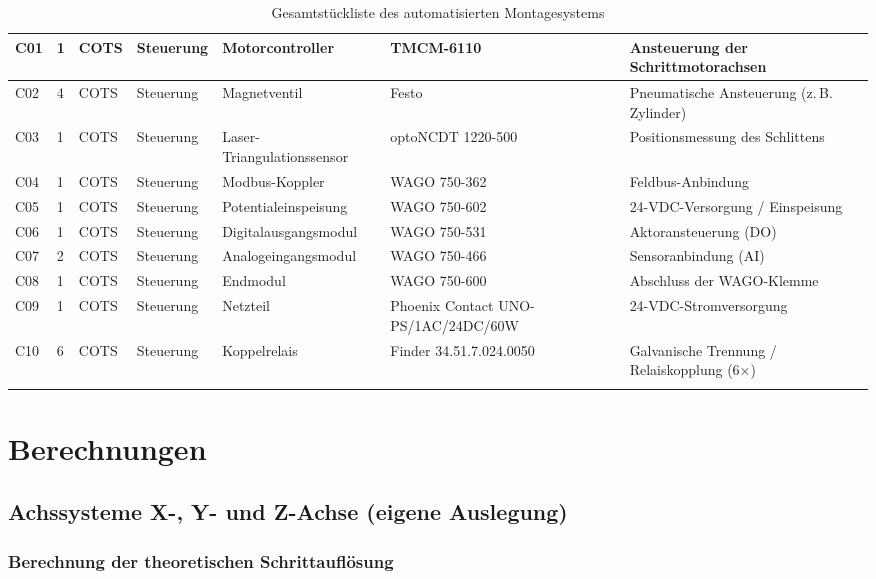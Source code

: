 \begin{landscape}
{\begin{longtable}{|l|l|l|l|l|p{4.6cm}|p{6.5cm}|}
C01 & 1 & COTS & Steuerung & Motorcontroller & TMCM-6110 & Ansteuerung der Schrittmotorachsen \\
\hline
C02 & 4 & COTS & Steuerung & Magnetventil & Festo & Pneumatische Ansteuerung (z.\,B. Zylinder) \\
\hline
C03 & 1 & COTS & Steuerung & Laser-Triangulationssensor & optoNCDT 1220-500 & Positionsmessung des Schlittens \\
\hline
C04 & 1 & COTS & Steuerung & Modbus-Koppler & WAGO 750-362 & Feldbus-Anbindung \\
\hline
C05 & 1 & COTS & Steuerung & Potentialeinspeisung & WAGO 750-602 & 24-VDC-Versorgung / Einspeisung \\
\hline
C06 & 1 & COTS & Steuerung & Digitalausgangsmodul & WAGO 750-531 & Aktoransteuerung (DO) \\
\hline
C07 & 2 & COTS & Steuerung & Analogeingangsmodul & WAGO 750-466 & Sensoranbindung (AI) \\
\hline
C08 & 1 & COTS & Steuerung & Endmodul & WAGO 750-600 & Abschluss der WAGO-Klemme \\
\hline
C09 & 1 & COTS & Steuerung & Netzteil & Phoenix Contact UNO-PS/1AC/24DC/60W & 24-VDC-Stromversorgung \\
\hline
C10 & 6 & COTS & Steuerung & Koppelrelais & Finder 34.51.7.024.0050 & Galvanische Trennung / Relaiskopplung (6×) \\
\hline

\caption{Gesamtstückliste des automatisierten Montagesystems}
\label{tab:gesamt_stueckliste}
\end{longtable}
}
\end{landscape}

\clearpage

\section{Berechnungen}
\label{anhang:berechnungen}
\subsection{Achssysteme X-, Y- und Z-Achse (eigene Auslegung)}

\subsubsection{Berechnung der theoretischen Schrittauflösung}

